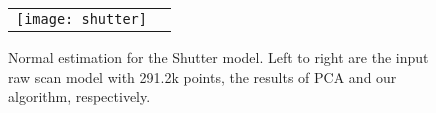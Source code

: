\begin{figure}
\begin{center}
    \begin{tabular}{c c }
        \texttt{[image: shutter]}
    \end{tabular}
    \caption{Normal estimation for the Shutter model. Left to right are the input raw scan model with 291.2k points, the results of PCA and our algorithm, respectively. \label{fig:shutter}}
\end{center}
\end{figure}
